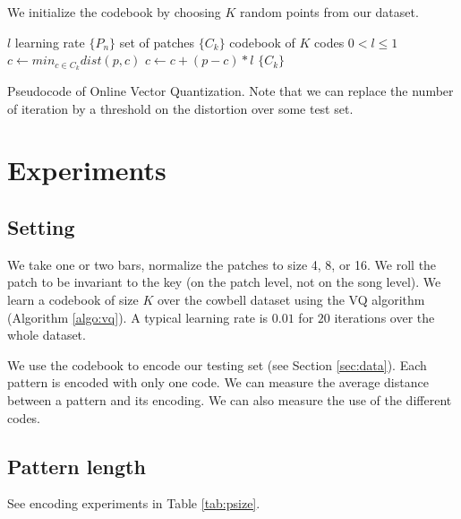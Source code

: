 \documentclass{article}
\begin{document}
We initialize the codebook by choosing $K$ random points from our dataset.


\begin{algorithm}
\begin{algorithmic}
\STATE$l$ learning rate
\STATE$\{P_n\}$ set of patches
\STATE$\{C_k\}$ codebook of $K$ codes
\REQUIRE $0 < l \leq 1$
\STATE$c \leftarrow min_{c \in C_k} dist(p,c)$
\STATE$c \leftarrow c + (p - c) * l$
\ENDFOR
\ENDFOR
\RETURN $\{C_k\}$
\caption{{Pseudocode of Online Vector Quantization. Note that we can replace
the number of iteration by a threshold on the distortion over some test set.}
\label{algo:vq}}
\end{algorithmic}
\end{algorithm}






\section{Experiments}\label{sec:experiments}

\subsection{Setting}\label{ssec:setting}
We take one or two bars, normalize the patches to size 4, 8, or 16.
We roll the patch to be invariant to the key (on the patch level, not on
the song level). We learn a codebook of size $K$ over the cowbell dataset 
using the VQ algorithm (Algorithm \ref{algo:vq}). A typical learning rate 
is $0.01$ for $20$ iterations over the whole dataset.

We use the codebook to encode our testing set (see Section \ref{sec:data}).
Each pattern is encoded with only one code. We can measure the average
distance between a pattern and its encoding. We can also measure the use
of the different codes.

\subsection{Pattern length}
See encoding experiments in Table \ref{tab:psize}.
\end{document}
